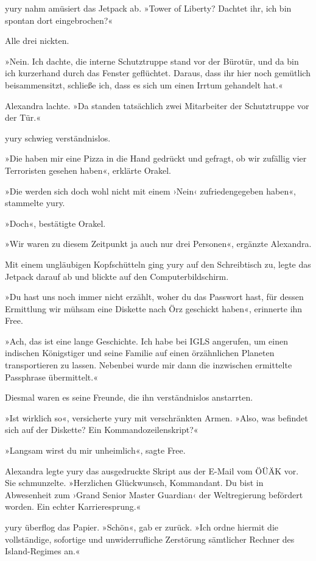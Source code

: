 yury nahm amüsiert das Jetpack ab. »Tower of Liberty? Dachtet ihr, ich bin spontan dort eingebrochen?«

Alle drei nickten.

»Nein. Ich dachte, die interne Schutztruppe stand vor der Bürotür, und da bin ich kurzerhand durch das Fenster geflüchtet. Daraus, dass ihr hier noch gemütlich beisammensitzt, schließe ich, dass es sich um einen Irrtum gehandelt hat.«

Alexandra lachte. »Da standen tatsächlich zwei Mitarbeiter der Schutztruppe vor der Tür.«

yury schwieg verständnislos.

»Die haben mir eine Pizza in die Hand gedrückt und gefragt, ob wir zufällig vier Terroristen gesehen haben«, erklärte Orakel.

»Die werden sich doch wohl nicht mit einem ›Nein‹ zufriedengegeben haben«, stammelte yury.

»Doch«, bestätigte Orakel.

»Wir waren zu diesem Zeitpunkt ja auch nur drei Personen«, ergänzte Alexandra.

Mit einem ungläubigen Kopfschütteln ging yury auf den Schreibtisch zu, legte das Jetpack darauf ab und blickte auf den Computerbildschirm.

»Du hast uns noch immer nicht erzählt, woher du das Passwort hast, für dessen Ermittlung wir mühsam eine Diskette nach Örz geschickt haben«, erinnerte ihn Free.

»Ach, das ist eine lange Geschichte. Ich habe bei IGLS angerufen, um einen indischen Königstiger und seine Familie auf einen örzähnlichen Planeten transportieren zu lassen. Nebenbei wurde mir dann die inzwischen ermittelte Passphrase übermittelt.«

Diesmal waren es seine Freunde, die ihn verständnislos anstarrten.

»Ist wirklich so«, versicherte yury mit verschränkten Armen. »Also, was befindet sich auf der Diskette? Ein Kommandozeilenskript?«

»Langsam wirst du mir unheimlich«, sagte Free.

Alexandra legte yury das ausgedruckte Skript aus der E-Mail vom ÖÜÄK vor. Sie schmunzelte. »Herzlichen Glückwunsch, Kommandant. Du bist in Abwesenheit zum ›Grand Senior Master Guardian‹ der Weltregierung befördert worden. Ein echter Karrieresprung.«

yury überflog das Papier. »Schön«, gab er zurück. »Ich ordne hiermit die vollständige, sofortige und unwiderrufliche Zerstörung sämtlicher Rechner des Island-Regimes an.«

